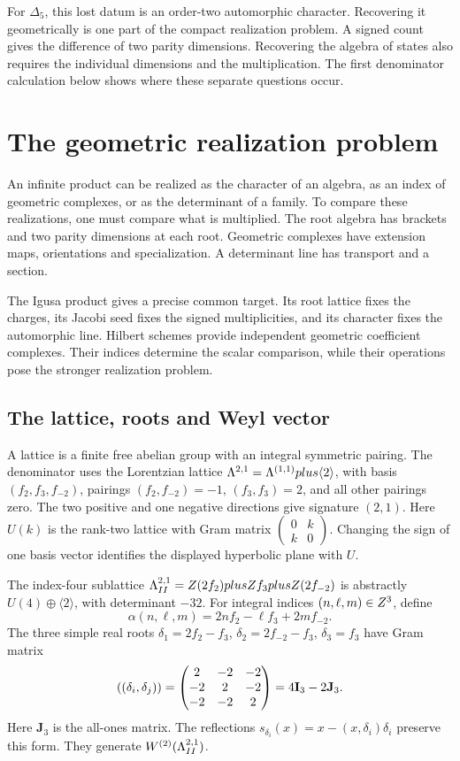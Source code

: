 For \(\Delta_5\), this lost datum is an order-two automorphic
character. Recovering it geometrically is one part of the compact
realization problem. A signed count gives the difference of two
parity dimensions. Recovering the algebra of states also requires
the individual dimensions and the multiplication.
The first denominator calculation below shows where these separate
questions occur.

\chapter{The geometric realization problem}
\label{ch:pentadic}

An infinite product can be realized as the character of an algebra,
as an index of geometric complexes, or as the determinant of a family.
To compare these realizations, one must compare what is multiplied.
The root algebra has brackets and two parity dimensions at each root.
Geometric complexes have extension maps, orientations and specialization.
A determinant line has transport and a section.

The Igusa product gives a precise common target.
Its root lattice fixes the charges, its Jacobi seed fixes the signed
multiplicities, and its character fixes the automorphic line.
Hilbert schemes provide independent geometric coefficient complexes.
Their indices determine the scalar comparison, while their operations
pose the stronger realization problem.

\section{The lattice, roots and Weyl vector}
\label{op:sec:root-datum}

A lattice is a finite free abelian group with an integral
symmetric pairing. The denominator uses the Lorentzian lattice
\(\Lambda^{2,1}=\Lambda^{(1,1)}plus\langle2\rangle\), with basis
\((f_2,f_3,f_{-2})\), pairings
\((f_2,f_{-2})=-1\), \((f_3,f_3)=2\), and all other pairings zero.
The two positive and one negative directions give signature
\((2,1)\). Here $U(k)$ is the rank-two lattice with Gram
matrix $\left(\begin{smallmatrix}0&k\\k&0\end{smallmatrix}\right)$.
Changing the sign of one basis vector identifies the displayed
hyperbolic plane with $U$.

The index-four sublattice
\(\Lambda^{2,1}_{II}=Z(2f_2)plusZ f_3plusZ(2f_{-2})\)
is abstractly \(U(4)\oplus\langle2\rangle\), with determinant
\(-32\). For integral indices \((n,\ell,m)\in Z^3\), define
\[
 \alpha(n,\ell,m)=2nf_2-\ell f_3+2mf_{-2}.
\]
The three simple real roots
\(\delta_1=2f_2-f_3\), \(\delta_2=2f_{-2}-f_3\),
\(\delta_3=f_3\) have Gram matrix
\[
 ((\delta_i,\delta_j))=
 \begin{pmatrix}2&-2&-2\\-2&2&-2\\-2&-2&2\end{pmatrix}
 =4\mathbf{I}_3-2\mathbf J_3.
\]
Here \(\mathbf J_3\) is the all-ones matrix. The reflections
\(s_{\delta_i}(x)=x-(x,\delta_i)\delta_i\) preserve this form.
They generate \(W^{(2)}(\Lambda^{2,1}_{II})\).

